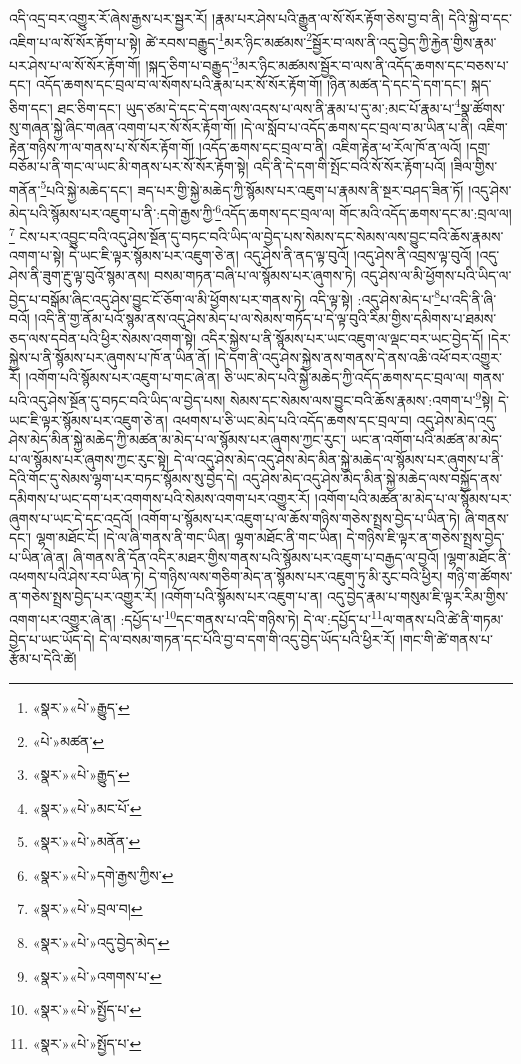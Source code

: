 འདི་འདྲ་བར་འགྱུར་རོ་ཞེས་རྒྱས་པར་སྦྱར་རོ། །རྣམ་པར་ཤེས་པའི་རྒྱུན་ལ་སོ་སོར་རྟོག་ཅེས་བྱ་བ་ནི། དེའི་སྐྱེ་བ་དང་འཇིག་པ་ལ་སོ་སོར་རྟོག་པ་སྟེ། ཚེ་རབས་བརྒྱུད་\footnote{«སྣར་»«པེ་»རྒྱུད་}མར་ཉིང་མཚམས་\footnote{«པེ་»མཚན་}སྦྱོར་བ་ལས་ནི་འདུ་བྱེད་ཀྱི་རྐྱེན་གྱིས་རྣམ་པར་ཤེས་པ་ལ་སོ་སོར་རྟོག་གོ། །སྐད་ཅིག་པ་བརྒྱུད་\footnote{«སྣར་»«པེ་»རྒྱུད་}མར་ཉིང་མཚམས་སྦྱོར་བ་ལས་ནི་འདོད་ཆགས་དང་བཅས་པ་དང་། འདོད་ཆགས་དང་བྲལ་བ་ལ་སོགས་པའི་རྣམ་པར་སོ་སོར་རྟོག་གོ། །ཉིན་མཚན་དེ་དང་དེ་དག་དང་། སྐད་ཅིག་དང་། ཐང་ཅིག་དང་། ཡུད་ཙམ་དེ་དང་དེ་དག་ལས་འདས་པ་ལས་ནི་རྣམ་པ་དུ་མ་:མང་པོ་རྣམ་པ་\footnote{«སྣར་»«པེ་»མང་པོ་}སྣ་ཚོགས་སུ་གཞན་སྐྱེ་ཞིང་གཞན་འགག་པར་སོ་སོར་རྟོག་གོ། །དེ་ལ་སློབ་པ་འདོད་ཆགས་དང་བྲལ་བ་མ་ཡིན་པ་ནི། འཇིག་རྟེན་གཉིས་ཀ་ལ་གནས་པ་སོ་སོར་རྟོག་གོ། །འདོད་ཆགས་དང་བྲལ་བ་ནི། འཇིག་རྟེན་ཕ་རོལ་ཁོ་ན་ལའོ། །དགྲ་བཅོམ་པ་ནི་གང་ལ་ཡང་མི་གནས་པར་སོ་སོར་རྟོག་སྟེ། འདི་ནི་དེ་དག་གི་སྤོང་བའི་སོ་སོར་རྟོག་པའོ། །ཟིལ་གྱིས་གནོན་\footnote{«སྣར་»«པེ་»མནོན་}པའི་སྐྱེ་མཆེད་དང་། ཟད་པར་གྱི་སྐྱེ་མཆེད་ཀྱི་སྙོམས་པར་འཇུག་པ་རྣམས་ནི་སྔར་བཤད་ཟིན་ཏོ། །འདུ་ཤེས་མེད་པའི་སྙོམས་པར་འཇུག་པ་ནི་:དགེ་རྒྱས་ཀྱི་\footnote{«སྣར་»«པེ་»དགེ་རྒྱས་ཀྱིས་}འདོད་ཆགས་དང་བྲལ་ལ། གོང་མའི་འདོད་ཆགས་དང་མ་:བྲལ་ལ།\footnote{«སྣར་»«པེ་»བྲལ་བ།} ངེས་པར་འབྱུང་བའི་འདུ་ཤེས་སྔོན་དུ་བཏང་བའི་ཡིད་ལ་བྱེད་པས་སེམས་དང་སེམས་ལས་བྱུང་བའི་ཆོས་རྣམས་འགག་པ་སྟེ། དེ་ཡང་ཇི་ལྟར་སྙོམས་པར་འཇུག་ཅེ་ན། འདུ་ཤེས་ནི་ནད་ལྟ་བུའོ། །འདུ་ཤེས་ནི་འབྲས་ལྟ་བུའོ། །འདུ་ཤེས་ནི་ཟུག་རྔུ་ལྟ་བུའོ་སྙམ་ནས། བསམ་གཏན་བཞི་པ་ལ་སྙོམས་པར་ཞུགས་ཏེ། འདུ་ཤེས་ལ་མི་ཕྱོགས་པའི་ཡིད་ལ་བྱེད་པ་བསྒོམ་ཞིང་འདུ་ཤེས་བྱུང་ངོ་ཅོག་ལ་མི་ཕྱོགས་པར་གནས་ཏེ། འདི་ལྟ་སྟེ། :འདུ་ཤེས་མེད་པ་\footnote{«སྣར་»«པེ་»འདུ་བྱེད་མེད་}པ་འདི་ནི་ཞི་བའོ། །འདི་ནི་གྱ་ནོམ་པའོ་སྙམ་ནས་འདུ་ཤེས་མེད་པ་ལ་སེམས་གཏོད་པ་དེ་ལྟ་བུའི་རིམ་གྱིས་དམིགས་པ་ཐམས་ཅད་ལས་དབེན་པའི་ཕྱིར་སེམས་འགག་སྟེ། འདིར་སྐྱེས་པ་ནི་སྙོམས་པར་ཡང་འཇུག་ལ་ལྡང་བར་ཡང་བྱེད་དོ། །དེར་སྐྱེས་པ་ནི་སྙོམས་པར་ཞུགས་པ་ཁོ་ན་ཡིན་ནོ། །དེ་དག་ནི་འདུ་ཤེས་སྐྱེས་ནས་གནས་དེ་ནས་འཆི་འཕོ་བར་འགྱུར་རོ། །འགོག་པའི་སྙོམས་པར་འཇུག་པ་གང་ཞེ་ན། ཅི་ཡང་མེད་པའི་སྐྱེ་མཆེད་ཀྱི་འདོད་ཆགས་དང་བྲལ་ལ། གནས་པའི་འདུ་ཤེས་སྔོན་དུ་བཏང་བའི་ཡིད་ལ་བྱེད་པས། སེམས་དང་སེམས་ལས་བྱུང་བའི་ཆོས་རྣམས་:འགག་པ་\footnote{«སྣར་»«པེ་»འགགས་པ་}སྟེ། དེ་ཡང་ཇི་ལྟར་སྙོམས་པར་འཇུག་ཅེ་ན། འཕགས་པ་ཅི་ཡང་མེད་པའི་འདོད་ཆགས་དང་བྲལ་བ། འདུ་ཤེས་མེད་འདུ་ཤེས་མེད་མིན་སྐྱེ་མཆེད་ཀྱི་མཚན་མ་མེད་པ་ལ་སྙོམས་པར་ཞུགས་ཀྱང་རུང་། ཡང་ན་འགོག་པའི་མཚན་མ་མེད་པ་ལ་སྙོམས་པར་ཞུགས་ཀྱང་རུང་སྟེ། དེ་ལ་འདུ་ཤེས་མེད་འདུ་ཤེས་མེད་མིན་སྐྱེ་མཆེད་ལ་སྙོམས་པར་ཞུགས་པ་ནི་དེའི་གོང་དུ་སེམས་ལྷག་པར་བཏང་སྙོམས་སུ་བྱེད་དེ། འདུ་ཤེས་མེད་འདུ་ཤེས་མེད་མིན་སྐྱེ་མཆེད་ལས་བསྐྱོད་ནས་དམིགས་པ་ཡང་དག་པར་འགགས་པའི་སེམས་འགག་པར་འགྱུར་རོ། །འགོག་པའི་མཚན་མ་མེད་པ་ལ་སྙོམས་པར་ཞུགས་པ་ཡང་དེ་དང་འདྲའོ། །འགོག་པ་སྙོམས་པར་འཇུག་པ་ལ་ཆོས་གཉིས་གཅེས་སྤྲས་བྱེད་པ་ཡིན་ཏེ། ཞི་གནས་དང་། ལྷག་མཐོང་ངོ། །དེ་ལ་ཞི་གནས་ནི་གང་ཡིན། ལྷག་མཐོང་ནི་གང་ཡིན། དེ་གཉིས་ཇི་ལྟར་ན་གཅེས་སྤྲས་བྱེད་པ་ཡིན་ཞེ་ན། ཞི་གནས་ནི་དོན་འདིར་མཐར་གྱིས་གནས་པའི་སྙོམས་པར་འཇུག་པ་བརྒྱད་ལ་བྱའོ། །ལྷག་མཐོང་ནི་འཕགས་པའི་ཤེས་རབ་ཡིན་ཏེ། དེ་གཉིས་ལས་གཅིག་མེད་ན་སྙོམས་པར་འཇུག་ཏུ་མི་རུང་བའི་ཕྱིར། གཉི་ག་ཚོགས་ན་གཅེས་སྤྲས་བྱེད་པར་འགྱུར་རོ། །འགོག་པའི་སྙོམས་པར་འཇུག་པ་ན། འདུ་བྱེད་རྣམ་པ་གསུམ་ཇི་ལྟར་རིམ་གྱིས་འགག་པར་འགྱུར་ཞེ་ན། :དཔྱོད་པ་\footnote{«སྣར་»«པེ་»སྤྱོད་པ་}དང་གནས་པ་འདི་གཉིས་ཏེ། དེ་ལ་:དཔྱོད་པ་\footnote{«སྣར་»«པེ་»སྤྱོད་པ་}ལ་གནས་པའི་ཚེ་ནི་གཏམ་བྱེད་པ་ཡང་ཡོད་དེ། དེ་ལ་བསམ་གཏན་དང་པོའི་བྱ་བ་དག་གི་འདུ་བྱེད་ཡོད་པའི་ཕྱིར་རོ། །གང་གི་ཚེ་གནས་པ་རྩོམ་པ་དེའི་ཚེ། 